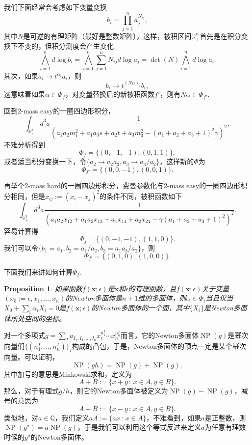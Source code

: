 \documentclass[12pt]{article}
\theoremstyle{definition}
\theoremstyle{plain}
\newtheorem{pro}[para]{Proposition}
\begin{document}
我们下面经常会考虑如下变量变换
\[
	b_i=\prod_{j=1}^n a_j^{N_{ij}},
\]
其中$N$是可逆的有理矩阵（最好是整数矩阵），这样，被积区间$\mathbb R_+^n$首先是在积分变换下不变的，但积分测度会产生变化
\[
	\bigwedge_{i=1}^n d\log b_i=\bigwedge_{i=1}^n\sum_{j=1}^n N_{ij}d\log a_j = \det(N) \bigwedge_{i=1}^n d\log a_i.
\]
其次，如果$a_i\to t^{\alpha_i}a_i$，则
\[
	b_i\to t^{(N \alpha)_i} b_i,
\]
这意味着如果$\alpha\in \Phi_f$，对变量替换后的新被积函数$f'$，则有$N \alpha\in \Phi_{f'}$. 


回到2-mass easy的一圈四边形积分，
\[
	\int_{\mathbb R_+^3}d^3a\frac{1}{(a_1a_2 m_1^2+a_1a_3s+a_2t+a_3m_3^2-(a_1+a_2+a_3+1)^2\gamma)^2},
\]
不难分析得到
\[
	\Phi_f=\{(0, -1, -1), (0, 1, 1)\},
\]
或者适当积分变换一下，令$\{a_2\to a_2a_3,a_3\to a_3/a_2\}$，这样新的$\Phi$为
\[
	\Phi_{f'}=\{(0, 0, -1), (0, 0, 1)\}.
\]

再举个2-mass hard的一圈四边形积分，费曼参数化与2-mass easy的一圈四边形积分相同，但是$x_{ij}:=(x_i-x_j)^2$的条件不同，被积函数如下
\[
	\int_{\mathbb R_+^3}d^3a\frac{1}{(a_1 a_2 x_{12}+a_1 a_3 x_{13}+a_1 x_{14}+a_2 x_{24}-\gamma (a_1+a_2+a_3+1)^2)^2}.
\]
容易计算得
\[
	\Phi_f=\{(0,-1,-1),(1,1,0)\}.
\]
我们可以令$\{b_1=a_1,b_2=a_1/a_2,b_3=a_1 a_3/a_2\}$，则
\[
	\Phi_{f'}=\{(0,1,0),(1,0,0)\}.
\]

下面我们来讲如何计算$\Phi_f$. 

\begin{pro}
如果函数$f(\mathbf{x};\epsilon)$是$\mathbf{x}$和$\epsilon$的有理函数，且$f(\mathbf{x};\epsilon)$关于变量$(x_0:=\epsilon,x_1,\dots,x_n)$的Newton多面体是$n+1$维的多面体，则$\alpha\in \Phi_i$当且仅当$X_0+\sum_{i}\alpha_i X_i=0$是$f(\mathbf{x};\epsilon)$的Newton多面体的一个面，其中$\{X_i\}$是Newton多面体所处空间的坐标。
\end{pro}

对一个多项式$g=\sum_I a_{I_1,I_2,\dots,I_n}x_1^{n^I_1}\cdots x_n^{n^I_n}$而言，它的Newton多面体$\operatorname{NP}(g)$是幂次向量们$\{(n^I_1,\dots,n^I_n)\}_I$构成的凸包，于是，Newton多面体的顶点一定是某个幂次向量。可以证明，
\[
	\operatorname{NP}(gh)=\operatorname{NP}(g)+\operatorname{NP}(g),
\]
其中加号的意思是Minkowski求和，定义为
\[
A+B:=\{x+y\,:\,x\in A, y\in B\}.
\]
那么，对于有理式$g/h$，则它的Newton多面体被定义为$\operatorname{NP}(g)-\operatorname{NP}(g)$，减号的意思为
\[
A-B:=\{x-y\,:\,x\in A, y\in B\}.
\]
类似地，对$a\in \mathbb Q$，我们定义$a A:=\{ax\,:\, x\in A\}$，不难看到，如果$a$是正整数，则$\operatorname{NP}(g^a)=a\operatorname{NP}(g)$，于是我们可以利用这个等式反过来定义$a$为任意有理数时候的$g^a$的Newton多面体。
\end{document}
